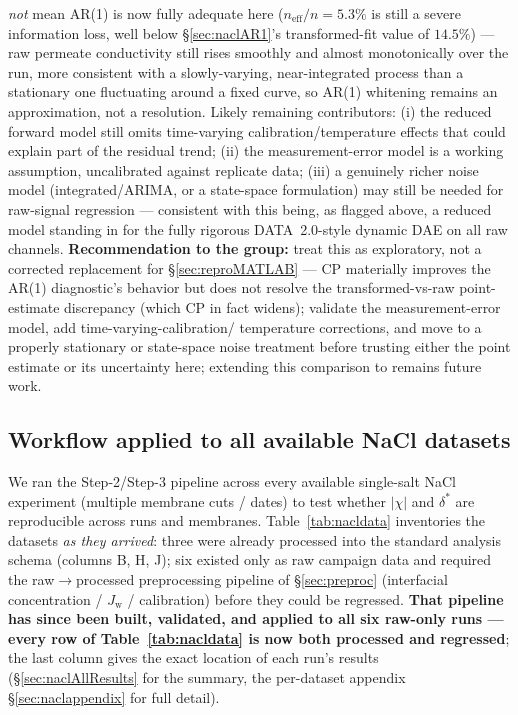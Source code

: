 \documentclass[11pt]{article}
\newcommand{\Jw}{J_{\mathrm{w}}}
\newcommand{\dstar}{\delta^{*}}
\begin{document}
\emph{not} mean AR(1) is now fully adequate here ($n_{\mathrm{eff}}/n=5.3\%$
is still a severe information loss, well below \S\ref{sec:naclAR1}'s
transformed-fit value of $14.5\%$) --- raw permeate conductivity still rises
smoothly and almost monotonically over the run, more consistent with a
slowly-varying, near-integrated process than a stationary one fluctuating
around a fixed curve, so AR(1) whitening remains an approximation, not a
resolution. Likely remaining contributors: (i) the reduced forward model
still omits time-varying calibration/temperature effects that could explain
part of the residual trend; (ii) the measurement-error model is a working
assumption, uncalibrated against replicate data; (iii) a genuinely richer
noise model (integrated/ARIMA, or a state-space formulation) may still be
needed for raw-signal regression --- consistent with this being, as flagged
above, a reduced model standing in for the fully rigorous DATA~2.0-style
dynamic DAE on all raw channels. \textbf{Recommendation to the group:} treat
this as exploratory, not a corrected replacement for \S\ref{sec:reproMATLAB}
--- CP materially improves the AR(1) diagnostic's behavior but does not
resolve the transformed-vs-raw point-estimate discrepancy (which CP in fact
widens); validate the measurement-error model, add time-varying-calibration/
temperature corrections, and move to a properly stationary or state-space
noise treatment before trusting either the point estimate or its uncertainty
here; extending this comparison to  remains future work.

\subsection{Workflow applied to all available NaCl datasets}\label{sec:naclAll}
We ran the Step-2/Step-3 pipeline across every available single-salt NaCl
experiment (multiple membrane cuts / dates) to test whether $|\chi|$ and $\dstar$
are reproducible across runs and membranes. Table~\ref{tab:nacldata} inventories
the datasets \emph{as they arrived}: three were already processed into the
standard analysis schema (columns B, H, J); six existed only as raw campaign
data and required the raw$\to$processed preprocessing pipeline of
\S\ref{sec:preproc} (interfacial concentration / $\Jw$ / calibration) before they
could be regressed. \textbf{That pipeline has since been built, validated, and
applied to all six raw-only runs --- every row of Table~\ref{tab:nacldata} is now
both processed and regressed}; the last column gives the exact location of each
run's results (\S\ref{sec:naclAllResults} for the summary, the per-dataset
appendix \S\ref{sec:naclappendix} for full detail).
\end{document}
